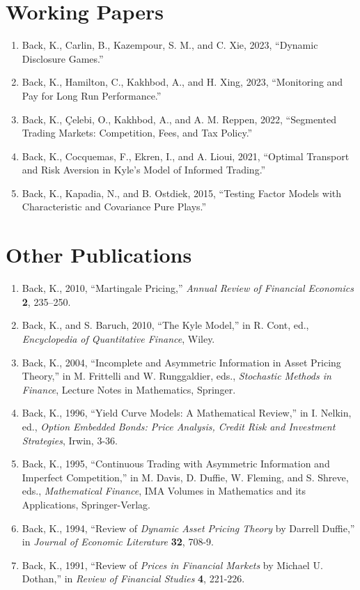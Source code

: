 \documentclass[margin, 11pt]{res}
\begin{document}
\begin{resume}
\section{\sc Working Papers}
\begin{enumerate}
\item Back, K., Carlin, B., Kazempour, S. M., and C. Xie, 2023, ``Dynamic Disclosure Games.''
\item Back, K., Hamilton, C., Kakhbod, A., and H. Xing, 2023, ``Monitoring and Pay for Long Run Performance.''
\item Back, K., \c{C}elebi, O., Kakhbod, A., and A. M. Reppen, 2022, ``Segmented Trading Markets: Competition, Fees, and Tax Policy.''
\item Back, K., Cocquemas, F., Ekren, I., and A. Lioui, 2021, ``Optimal Transport and Risk Aversion in Kyle's Model of Informed Trading.''
\item Back, K., Kapadia, N., and B. Ostdiek, 2015, ``Testing Factor Models with Characteristic and Covariance Pure Plays.''

\end{enumerate}

\section{\sc Other Publications}
\begin{enumerate}
\item Back, K., 2010, ``Martingale Pricing,'' \textit{Annual Review of Financial Economics} \textbf{2}, 235--250.
\item Back, K., and S. Baruch, 2010, ``The Kyle Model,'' in R. Cont, ed., \textit{Encyclopedia of Quantitative Finance}, Wiley.
\item Back, K., 2004, ``Incomplete and Asymmetric Information in Asset Pricing Theory,'' in M. Frittelli and W. Runggaldier, eds., \textit{Stochastic Methods in Finance}, Lecture Notes in Mathematics, Springer.
\item Back, K., 1996, ``Yield Curve Models: A Mathematical Review,''
in I. Nelkin, ed., {\em Option Embedded
Bonds: Price Analysis, Credit Risk and Investment Strategies}, Irwin, 3-36.
\item Back, K., 1995, ``Continuous Trading with Asymmetric Information and Imperfect
Competition,'' in M. Davis, D. Duffie, W.
Fleming, and S. Shreve, eds., {\em Mathematical Finance},
IMA Volumes in Mathematics
and its Applications, Springer-Verlag.
\item Back, K., 1994, ``Review of {\em Dynamic Asset Pricing Theory\/} by Darrell Duffie,'' in
{\em Journal of Economic Literature\/} {\bf 32}, 708-9.
\item Back, K., 1991, ``Review of {\em Prices in Financial Markets\/} by Michael U.
Dothan,'' in {\em Review of Financial Studies\/} {\bf 4}, 221-226.
\end{enumerate}


\end{resume}
\end{document}
